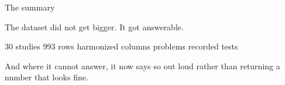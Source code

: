 \documentclass[11pt, t, handout]{beamer}
\newcommand{\ans}[1]{\textcolor{structure.fg}{#1}}
\begin{document}
\begin{frame}{The summary}
  \pause
  \begin{center}\large
  The dataset did not get bigger. \ans{It got answerable.}
  \end{center}
  \vspace{14pt}
  \pause
  \begin{center}\footnotesize
  30 studies 993 rows  harmonized columns  problems
  recorded  tests
  \end{center}
  \vspace{14pt}
  \pause
  {\footnotesize And where it cannot answer, it now says so out loud rather
   than returning a number that looks fine.}
\end{frame}
\end{document}
